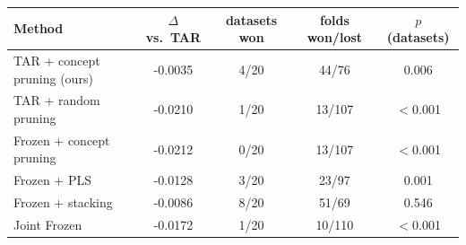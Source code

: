 \begin{tabular}{lcccc}
\toprule
Method & $\Delta$ vs.\ TAR & datasets won & folds won/lost & $p$ (datasets) \\
\midrule
TAR + concept pruning (ours) & -0.0035 & 4/20 & 44/76 & 0.006 \\
TAR + random pruning & -0.0210 & 1/20 & 13/107 & $<$0.001 \\
Frozen + concept pruning & -0.0212 & 0/20 & 13/107 & $<$0.001 \\
Frozen + PLS & -0.0128 & 3/20 & 23/97 & 0.001 \\
Frozen + stacking & -0.0086 & 8/20 & 51/69 & 0.546 \\
Joint Frozen & -0.0172 & 1/20 & 10/110 & $<$0.001 \\
\bottomrule
\end{tabular}
